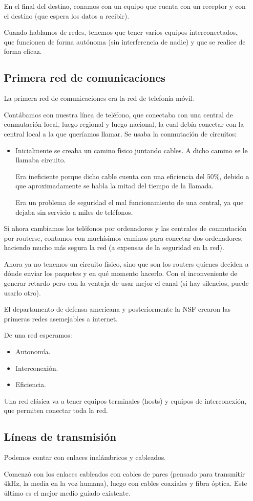 En el final del destino, conamos con un equipo que cuenta con un receptor y con el destino (que espera los datos a recibir).


Cuando hablamos de redes, tenemos que tener varios equipos interconectados, que funcionen de forma autónoma (sin interferencia de nadie) y que se realice de forma eficaz.

\subsection{Primera red de comunicaciones}

La primera red de comunicaciones era la red de telefonía móvil.

Contábamos con nuestra línea de teléfono, que conectaba con una central de conmutación local, luego regional y luego nacional, la cual debía conectar con la central local a la que queríamos llamar.
Se usaba la conmutación de circuitos: 
\begin{itemize}
    \item Inicialmente se creaba un camino físico juntando cables. A dicho camino se le llamaba circuito.

        Era ineficiente porque dicho cable cuenta con una eficiencia del 50\%, debido a que aproximadamente se habla la mitad del tiempo de la llamada.

        Era un problema de seguridad el mal funcionamiento de una central, ya que dejaba sin servicio a miles de teléfonos.
\end{itemize}

Si ahora cambiamos los teléfonos por ordenadores y las centrales de conmutación por routerse, contamos con muchísimos caminos para conectar dos ordenadores, haciendo mucho más segura la red (a expensas de la seguridad en la red).

Ahora ya no tenemos un circuito físico, sino que son los routers quienes deciden a dónde enviar los paquetes y en qué momento hacerlo. Con el inconveniente de generar retardo pero con la ventaja de usar mejor el canal (si hay silencios, puede usarlo otro).

El departamento de defensa americana y posteriormente la NSF crearon las primeras redes asemejables a internet.

De una red esperamos:
\begin{itemize}
    \item Autonomía.
    \item Interconexión.
    \item Eficiencia.
\end{itemize}

Una red clásica va a tener equipos terminales (hosts) y equipos de interconexión, que permiten conectar toda la red.

\subsection{Líneas de transmisión}
Podemos contar con enlaces inalámbricos y cableados.

Comenzó con los enlaces cableados con cables de pares (pensado para transmitir 4kHz, la media en la voz humana), luego con cables coaxiales y fibra óptica.
Este último es el mejor medio guiado existente.

